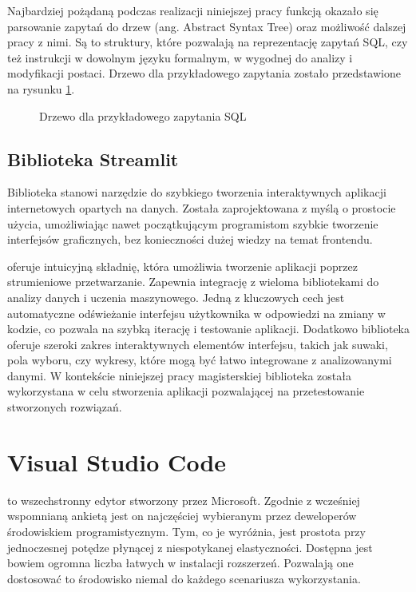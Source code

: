 Najbardziej pożądaną podczas realizacji niniejszej pracy funkcją okazało się parsowanie zapytań do drzew  (ang. Abstract Syntax Tree) oraz możliwość dalszej pracy z nimi. Są to struktury, które pozwalają na reprezentację zapytań SQL, czy też instrukcji w dowolnym języku formalnym, w wygodnej do analizy i modyfikacji postaci. Drzewo  dla przykładowego zapytania zostało przedstawione na rysunku \ref{fig:sql-ast-example}.

\begin{figure}[ht!]
  \centering
  
  \caption{Drzewo  dla przykładowego zapytania SQL}
  \label{fig:sql-ast-example}
\end{figure}

\subsection{Biblioteka Streamlit}
Biblioteka  stanowi narzędzie do szybkiego tworzenia interaktywnych aplikacji internetowych opartych na danych. Została zaprojektowana z myślą o prostocie użycia, umożliwiając nawet początkującym programistom szybkie tworzenie interfejsów graficznych, bez konieczności dużej wiedzy na temat frontendu. 

 oferuje intuicyjną składnię, która umożliwia tworzenie aplikacji poprzez strumieniowe przetwarzanie. Zapewnia integrację z wieloma bibliotekami do analizy danych i uczenia maszynowego. Jedną z kluczowych cech  jest automatyczne odświeżanie interfejsu użytkownika w odpowiedzi na zmiany w kodzie, co pozwala na szybką iterację i testowanie aplikacji. Dodatkowo biblioteka oferuje szeroki zakres interaktywnych elementów interfejsu, takich jak suwaki, pola wyboru, czy wykresy, które mogą być łatwo integrowane z analizowanymi danymi. W kontekście niniejszej pracy magisterskiej biblioteka  została wykorzystana w celu stworzenia aplikacji pozwalającej na przetestowanie stworzonych rozwiązań.

\section{Visual Studio Code}
 to wszechstronny edytor stworzony przez Microsoft. Zgodnie z wcześniej wspomnianą ankietą   jest on najczęściej wybieranym przez deweloperów środowiskiem programistycznym. Tym, co je wyróżnia, jest prostota przy jednoczesnej potędze płynącej z niespotykanej elastyczności. Dostępna jest bowiem ogromna liczba łatwych w instalacji rozszerzeń. Pozwalają one dostosować to środowisko niemal do każdego scenariusza wykorzystania.

